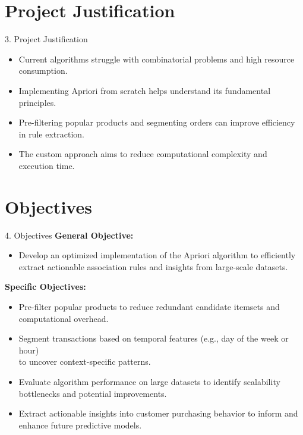 \documentclass{beamer}
\begin{document}
\section{Project Justification}

\begin{frame}{3. Project Justification}
    \begin{itemize}
        \item Current algorithms struggle with combinatorial problems and high resource \\
              consumption.
        \item Implementing Apriori from scratch helps understand its fundamental principles.
        \item Pre-filtering popular products and segmenting orders can improve efficiency \\
              in rule extraction.
        \item The custom approach aims to reduce computational complexity and execution time.
    \end{itemize}
\end{frame}

\section{Objectives}

\begin{frame}{4. Objectives}
    \textbf{General Objective:}
    \begin{itemize}
        \item Develop an optimized implementation of the Apriori algorithm to efficiently\\
              extract actionable association rules and insights from large-scale datasets.
    \end{itemize}

    \textbf{Specific Objectives:}
    \begin{itemize}
        \item Pre-filter popular products to reduce redundant candidate itemsets and\\
              computational overhead.
        \item Segment transactions based on temporal features (e.g., day of the week or hour) \\
              to uncover context-specific patterns.
        \item Evaluate algorithm performance on large datasets to identify scalability \\
              bottlenecks and potential improvements.
        \item Extract actionable insights into customer purchasing behavior to inform and \\
              enhance future predictive models.
    \end{itemize}
\end{frame}
\end{document}
